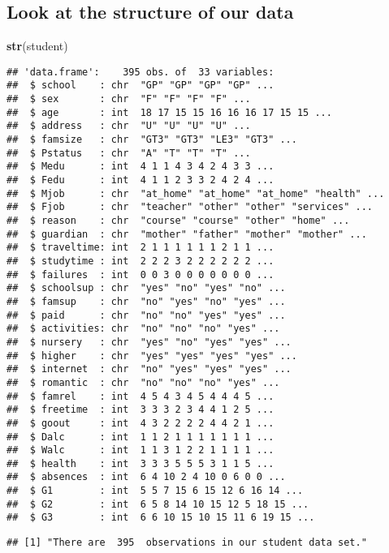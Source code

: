 \documentclass[
]{book}
\newenvironment{Shaded}{\begin{snugshade}}{\end{snugshade}}
\newcommand{\FunctionTok}[1]{\textcolor[rgb]{0.13,0.29,0.53}{\textbf{#1}}}
\newcommand{\NormalTok}[1]{#1}
\theoremstyle{definition}
\theoremstyle{definition}
\theoremstyle{definition}
\theoremstyle{definition}
\theoremstyle{remark}
\begin{document}
\hypertarget{look-at-the-structure-of-our-data}{%
\subsection{Look at the structure of our data}\label{look-at-the-structure-of-our-data}}

\begin{Shaded}
\begin{Highlighting}[]
\FunctionTok{str}\NormalTok{(student)}
\end{Highlighting}
\end{Shaded}

\begin{verbatim}
## 'data.frame':    395 obs. of  33 variables:
##  $ school    : chr  "GP" "GP" "GP" "GP" ...
##  $ sex       : chr  "F" "F" "F" "F" ...
##  $ age       : int  18 17 15 15 16 16 16 17 15 15 ...
##  $ address   : chr  "U" "U" "U" "U" ...
##  $ famsize   : chr  "GT3" "GT3" "LE3" "GT3" ...
##  $ Pstatus   : chr  "A" "T" "T" "T" ...
##  $ Medu      : int  4 1 1 4 3 4 2 4 3 3 ...
##  $ Fedu      : int  4 1 1 2 3 3 2 4 2 4 ...
##  $ Mjob      : chr  "at_home" "at_home" "at_home" "health" ...
##  $ Fjob      : chr  "teacher" "other" "other" "services" ...
##  $ reason    : chr  "course" "course" "other" "home" ...
##  $ guardian  : chr  "mother" "father" "mother" "mother" ...
##  $ traveltime: int  2 1 1 1 1 1 1 2 1 1 ...
##  $ studytime : int  2 2 2 3 2 2 2 2 2 2 ...
##  $ failures  : int  0 0 3 0 0 0 0 0 0 0 ...
##  $ schoolsup : chr  "yes" "no" "yes" "no" ...
##  $ famsup    : chr  "no" "yes" "no" "yes" ...
##  $ paid      : chr  "no" "no" "yes" "yes" ...
##  $ activities: chr  "no" "no" "no" "yes" ...
##  $ nursery   : chr  "yes" "no" "yes" "yes" ...
##  $ higher    : chr  "yes" "yes" "yes" "yes" ...
##  $ internet  : chr  "no" "yes" "yes" "yes" ...
##  $ romantic  : chr  "no" "no" "no" "yes" ...
##  $ famrel    : int  4 5 4 3 4 5 4 4 4 5 ...
##  $ freetime  : int  3 3 3 2 3 4 4 1 2 5 ...
##  $ goout     : int  4 3 2 2 2 2 4 4 2 1 ...
##  $ Dalc      : int  1 1 2 1 1 1 1 1 1 1 ...
##  $ Walc      : int  1 1 3 1 2 2 1 1 1 1 ...
##  $ health    : int  3 3 3 5 5 5 3 1 1 5 ...
##  $ absences  : int  6 4 10 2 4 10 0 6 0 0 ...
##  $ G1        : int  5 5 7 15 6 15 12 6 16 14 ...
##  $ G2        : int  6 5 8 14 10 15 12 5 18 15 ...
##  $ G3        : int  6 6 10 15 10 15 11 6 19 15 ...
\end{verbatim}

\begin{verbatim}
## [1] "There are  395  observations in our student data set."
\end{verbatim}
\end{document}
